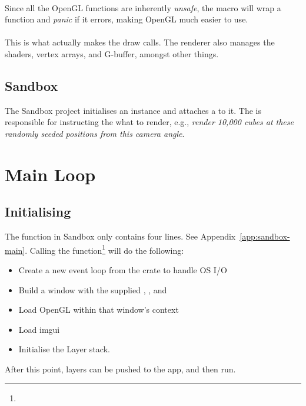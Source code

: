 \paragraph{}
Since all the OpenGL functions are inherently \emph{unsafe}, the  macro will wrap a function and \emph{panic} if it errors, making OpenGL much easier to use.

\paragraph{}
This is what actually makes the draw calls.
The renderer also manages the shaders, vertex arrays, and G-buffer, amongst other things.

\subsection{Sandbox}
The Sandbox project initialises an  instance and attaches a  to it.
The  is responsible for instructing the  what to render, e.g., \emph{render 10,000 cubes at these randomly seeded positions from this camera angle}.

\section{Main Loop}\label{sec:main-loop}

\subsection{Initialising}
The  function in Sandbox only contains four lines. See Appendix~\ref{app:sandbox-main}.
Calling the  function\footnote{} will do the following:
\begin{itemize}
  \item Create a new event loop from the  crate to handle OS I/O
  \item Build a window with the supplied , , and 
  \item Load OpenGL within that window's context
  \item Load imgui
  \item Initialise the Layer stack.
\end{itemize}
After this point, layers can be pushed to the app, and then run.

